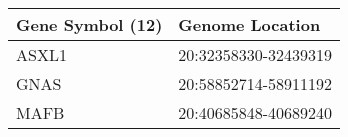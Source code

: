 \begin{tabular}{ll}
\toprule
Gene Symbol (12) &      Genome Location \\
\midrule
           ASXL1 & 20:32358330-32439319 \\
            GNAS & 20:58852714-58911192 \\
            MAFB & 20:40685848-40689240 \\
\bottomrule
\end{tabular}
